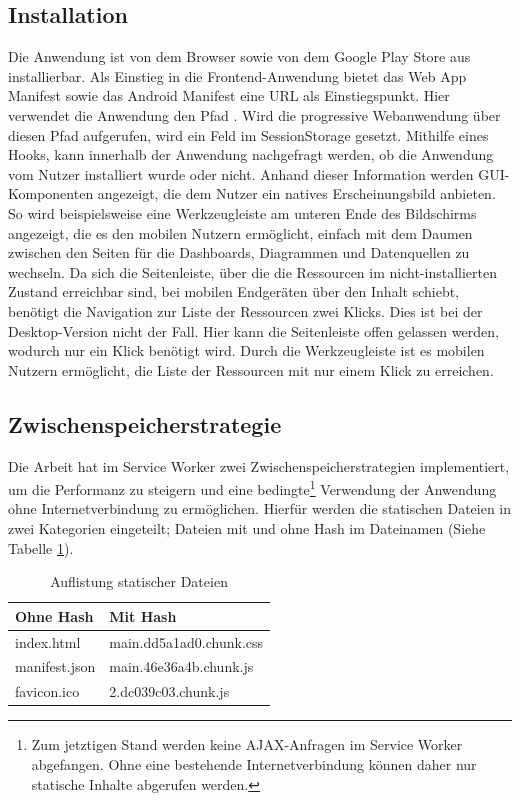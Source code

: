\subsection{Installation}
\label{subec:installation}
Die Anwendung ist von dem Browser sowie von dem Google Play Store aus installierbar. Als Einstieg
in die Frontend-Anwendung bietet das Web App Manifest sowie das Android Manifest eine URL als Einstiegspunkt.
Hier verwendet die Anwendung den Pfad . Wird die progressive Webanwendung über diesen Pfad
aufgerufen, wird ein Feld im SessionStorage gesetzt. Mithilfe eines  Hooks, kann innerhalb
der Anwendung nachgefragt werden, ob die Anwendung vom Nutzer installiert wurde oder nicht. Anhand dieser
Information werden GUI-Komponenten angezeigt, die dem Nutzer ein natives Erscheinungsbild anbieten. So wird beispielsweise
eine Werkzeugleiste am unteren Ende des Bildschirms angezeigt, die es den mobilen Nutzern ermöglicht,
einfach mit dem Daumen zwischen den Seiten für die Dashboards, Diagrammen und Datenquellen zu wechseln.
Da sich die Seitenleiste, über die die Ressourcen im nicht-installierten Zustand erreichbar sind, bei mobilen
Endgeräten über den Inhalt schiebt, benötigt die Navigation zur Liste der Ressourcen zwei Klicks. Dies ist
bei der Desktop-Version nicht der Fall. Hier kann die Seitenleiste offen gelassen werden, wodurch nur ein Klick
benötigt wird. Durch die Werkzeugleiste ist es mobilen Nutzern ermöglicht, die Liste der Ressourcen mit nur einem
Klick zu erreichen.


\subsection{Zwischenspeicherstrategie}
\label{subsec:zwischenspeicherstrategie}
Die Arbeit hat im Service Worker zwei Zwischenspeicherstrategien implementiert,
um die Performanz zu steigern und eine bedingte\footnote{Zum jetztigen Stand
werden keine AJAX-Anfragen im Service Worker abgefangen. Ohne eine bestehende Internetverbindung
können daher nur statische Inhalte abgerufen werden.}
Verwendung der Anwendung ohne Internetverbindung zu ermöglichen. Hierfür werden die statischen Dateien in zwei
Kategorien eingeteilt; Dateien mit und ohne Hash im Dateinamen (Siehe Tabelle \ref{tab:auflistungstatischerdateien}).

\begin{table}[h]
\begin{center}
\begin{tabular}{ll}
Ohne Hash & Mit Hash\\
\hline
index.html & main.dd5a1ad0.chunk.css\\
manifest.json & main.46e36a4b.chunk.js\\
favicon.ico & 2.dc039c03.chunk.js\\
\end{tabular}
\end{center}
\caption{Auflistung statischer Dateien}
\label{tab:auflistungstatischerdateien}
\end{table}

